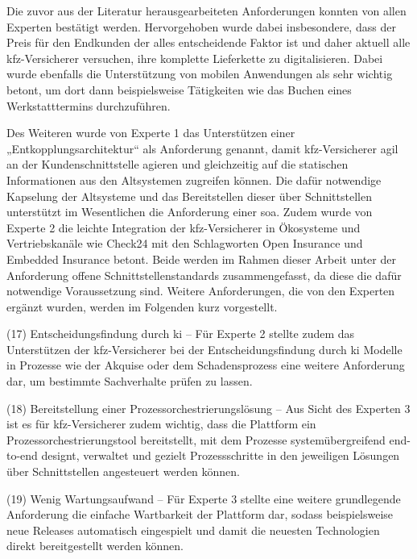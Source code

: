 
Die zuvor aus der Literatur herausgearbeiteten Anforderungen konnten von allen Experten bestätigt werden. Hervorgehoben wurde dabei insbesondere, dass der Preis für den Endkunden der alles entscheidende Faktor ist und daher aktuell alle \ac{kfz}-Versicherer versuchen, ihre komplette Lieferkette zu digitalisieren. Dabei wurde ebenfalls die Unterstützung von mobilen Anwendungen als sehr wichtig betont, um dort dann beispielsweise Tätigkeiten wie das Buchen eines Werkstatttermins durchzuführen. 

Des Weiteren wurde von Experte 1 das Unterstützen einer „Entkopplungsarchitektur“ als Anforderung genannt, damit \ac{kfz}-Versicherer agil an der Kundenschnittstelle agieren und gleichzeitig auf die statischen Informationen aus den Altsystemen zugreifen können.\autocite[Vgl.][]{LEMONIDIS2023} Die dafür notwendige Kapselung der Altsysteme und das Bereitstellen dieser über Schnittstellen unterstützt im Wesentlichen die Anforderung einer \ac{soa}. Zudem wurde von Experte 2 die leichte Integration der \ac{kfz}-Versicherer in Ökosysteme und Vertriebskanäle wie Check24 mit den Schlagworten Open Insurance und Embedded Insurance betont.\autocite[Vgl.][]{GREBERT2023} Beide werden im Rahmen dieser Arbeit unter der Anforderung offene Schnittstellenstandards zusammengefasst, da diese die dafür notwendige Voraussetzung sind. Weitere Anforderungen, die von den Experten ergänzt wurden, werden im Folgenden kurz vorgestellt.

(17) Entscheidungsfindung durch \ac{ki} – Für Experte 2 stellte zudem das Unterstützen der \ac{kfz}-Versicherer bei der Entscheidungsfindung durch \ac{ki} Modelle in Prozesse wie der Akquise oder dem Schadensprozess eine weitere Anforderung dar, um bestimmte Sachverhalte prüfen zu lassen.\autocite[Vgl.][]{GREBERT2023} 

(18) Bereitstellung einer Prozessorchestrierungslösung – Aus Sicht des Experten 3 ist es für \ac{kfz}-Versicherer zudem wichtig, dass die Plattform ein Prozessorchestrierungstool bereitstellt, mit dem Prozesse systemübergreifend end-to-end designt, verwaltet und gezielt Prozessschritte in den jeweiligen Lösungen über Schnittstellen angesteuert werden können. \autocite[Vgl.][]{SCHMIDT2023} 

(19) Wenig Wartungsaufwand – Für Experte 3 stellte eine weitere grundlegende Anforderung die einfache Wartbarkeit der Plattform dar, sodass beispielsweise neue Releases automatisch eingespielt und damit die neuesten Technologien direkt bereitgestellt werden können. \autocite[Vgl.][]{SCHMIDT2023} 

